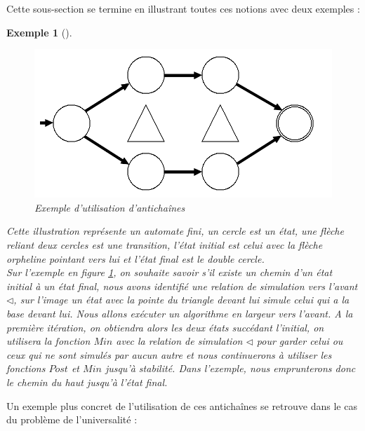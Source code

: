\documentclass[a4paper]{report}
\theoremstyle{break}
\newtheorem{exem}{Exemple}
\theoremstyle{breakplain}
\begin{document}
Cette sous-section se termine en illustrant toutes ces notions avec deux exemples :

\begin{exem}[]
\begin{figure}[!h]
\includegraphics[width=\textwidth]{images/exanti2.png}
\caption{Exemple d'utilisation d'antichaînes}
\label{dfna}
\end{figure}

Cette illustration représente un automate fini, un cercle est un état, une flèche reliant deux cercles est une transition, l'état initial est celui avec la flèche orpheline pointant vers lui et l'état final est le double cercle.\\

Sur l'exemple en figure \ref{dfna}, on souhaite savoir s'il existe un chemin d'un état initial à un état final, nous avons identifié une relation de simulation vers l'avant $\triangleleft$, sur l'image un état avec la pointe du triangle devant lui simule celui qui a la base devant lui. Nous allons exécuter un algorithme en largeur vers l'avant. A la première itération, on obtiendra alors les deux états succédant l'initial, on utilisera la fonction $Min$ avec la relation de simulation $\triangleleft$ pour garder celui ou ceux qui ne sont simulés par aucun autre et nous continuerons à utiliser les fonctions $Post$ et $Min$ jusqu'à stabilité. Dans l'exemple, nous emprunterons donc le chemin du haut jusqu'à l'état final.

\end{exem}

Un exemple plus concret de l'utilisation de ces antichaînes se retrouve dans le cas du problème de l'universalité :
\end{document}
